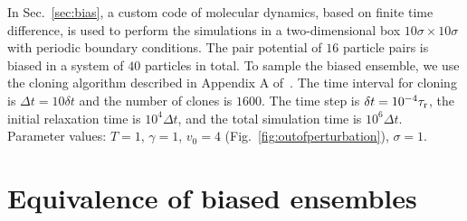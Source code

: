 \documentclass[pre, superscriptaddress, twocolumn,pre]{revtex4-1}
\begin{document}
In Sec.~\ref{sec:bias}, a custom code of molecular dynamics, based on finite time difference, is used to perform the simulations in a two-dimensional box $10\sigma\times 10\sigma$ with periodic boundary conditions. The pair potential of $16$ particle pairs is biased in a system of $40$ particles in total. To sample the biased ensemble, we use the cloning algorithm described in Appendix A of~\cite{Nemoto2016}. The time interval for cloning is $\Delta t = 10 \delta t$ and the number of clones is $1600$. The time step is $\delta t = 10^{-4} \tau_{\rm r}$, the initial relaxation time is $10^4\Delta t$, and the total simulation time is $10^6 \Delta t$. Parameter values: $T=1$, $\gamma=1$, $v_0=4$ (Fig.~\ref{fig:outofperturbation}), $\sigma=1$.




\section{Equivalence of biased ensembles}\label{app:far}
\end{document}
